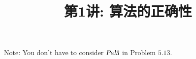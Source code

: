 \documentclass[a4paper, justified]{tufte-handout}
\title{第1讲: 算法的正确性}
\date{\zhtoday} %
\begin{document}
\maketitle
\noplagiarism %
\begin{abstract}
\end{abstract}
\beginrequired

\begin{problem}
\end{problem}

\begin{solution}
\end{solution}

\begin{problem}
\end{problem}

\begin{solution}
\end{solution}

\begin{problem}
\end{problem}

\begin{solution}
\end{solution}

\begin{problem}
\end{problem}

\begin{solution}
\end{solution}

\begin{problem}
  Note: You don't have to consider $\textsl{Pal3}$ in Problem $5.13$.
\end{problem}
\end{document}

